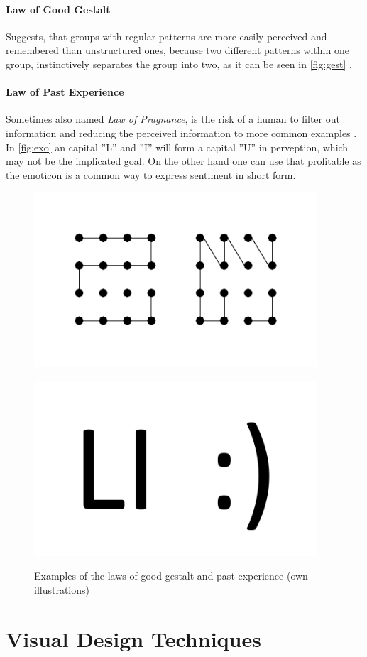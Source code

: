 \paragraph*{Law of Good Gestalt} Suggests, that groups with regular patterns are more easily perceived and remembered than unstructured ones, because two different patterns within one group, instinctively separates the group into two, as it can be seen in \ref{fig:gest} \parencite{Todorovic.2008}.
\paragraph*{Law of Past Experience} Sometimes also named \textit{Law of Pragnance}, is the risk of a human to filter out information and reducing the perceived information to more common examples \parencite{Stevenson.n.y.}. In \ref{fig:exo} an capital ''L'' and ''I'' will form a capital ''U'' in perveption, which may not be the implicated goal. On the other hand one can use that profitable as the emoticon is a common way to express sentiment in short form.
\begin{figure}[H] 
    \begin{minipage}[b]{.5\linewidth}
        \centering\includegraphics[width=0.94\textwidth]{img/gestalt.pdf}
        \label{fig:gest}
    \end{minipage}%
    \begin{minipage}[b]{.5\linewidth}
        \centering\includegraphics[width=0.94\textwidth]{img/experience.pdf}
        \label{fig:exo}
    \end{minipage}
    \caption[Laws of Good Gestalt and Past Experience]{Examples of the laws of good gestalt and past experience (own illustrations)}\label{fig:law4}
\end{figure}
\section{Visual Design Techniques}
